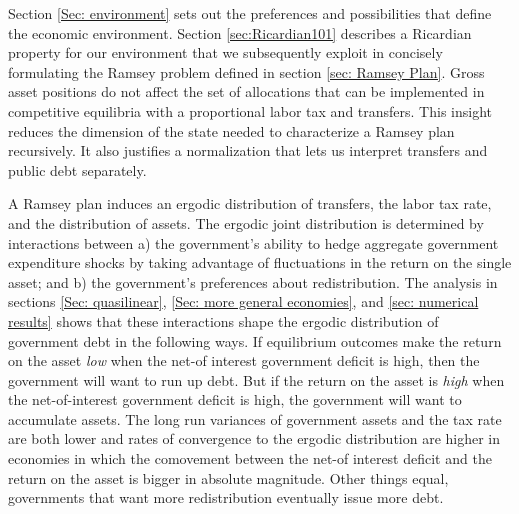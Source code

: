 \documentclass[thmsb,11pt]{article}
\begin{document}
%
%

Section \ref{Sec: environment} sets out the preferences and possibilities that define the economic environment.  
Section \ref{sec:Ricardian101}
describes a  Ricardian property for our environment that we subsequently exploit in concisely formulating the Ramsey problem defined
in section \ref{sec: Ramsey Plan}.  
Gross asset positions  do not affect the set of allocations that can be implemented
in competitive equilibria with a proportional labor tax and transfers.
This insight reduces the dimension of the state needed to characterize a Ramsey plan recursively.
It also justifies a normalization that lets  us interpret transfers and public debt separately.



A Ramsey plan induces an ergodic distribution of transfers,   the labor tax rate, and the distribution of assets.
The ergodic joint distribution is  determined by interactions between
a) the government's  ability to hedge aggregate government expenditure shocks
  by taking advantage of fluctuations in  the return on the single  asset;
and b) the government's preferences about  redistribution.
The analysis in sections \ref{Sec: quasilinear}, \ref{Sec: more general economies}, and \ref{sec: numerical results}
shows that these interactions  shape  the ergodic distribution of government debt in the following ways.
If equilibrium outcomes make the  return on the asset {\em low} when the net-of interest government deficit is high,
then the government will want to run up  debt.  %
But if the return on the asset is {\em high} when the net-of-interest government deficit is high, the
 government will want to accumulate assets.
  The long run variances of government assets and the tax rate are both lower and  rates of convergence to the ergodic distribution are
higher in economies in which the comovement between the net-of interest deficit and  the return on  the asset is bigger in absolute magnitude.
 Other things equal, governments that want more redistribution eventually issue more debt.
\end{document}
